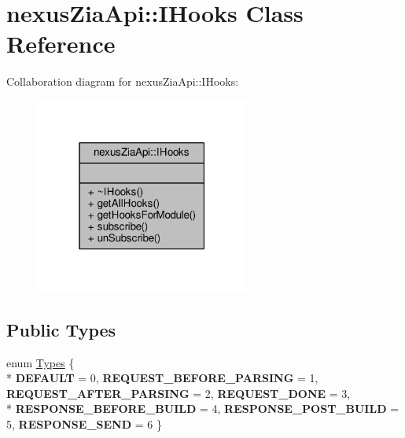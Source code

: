\hypertarget{classnexusZiaApi_1_1IHooks}{}\section{nexus\+Zia\+Api\+:\+:I\+Hooks Class Reference}
\label{classnexusZiaApi_1_1IHooks}


Collaboration diagram for nexus\+Zia\+Api\+:\+:I\+Hooks\+:\nopagebreak
\begin{figure}[H]
\begin{center}
\leavevmode
\includegraphics[width=199pt]{classnexusZiaApi_1_1IHooks__coll__graph}
\end{center}
\end{figure}
\subsection*{Public Types}
\begin{DoxyCompactItemize}
\item 
enum \hyperlink{classnexusZiaApi_1_1IHooks_ab414a80fd9ed1c967916942ec5c20433}{Types} \{ \\*
{\bfseries D\+E\+F\+A\+U\+LT} = 0, 
{\bfseries R\+E\+Q\+U\+E\+S\+T\+\_\+\+B\+E\+F\+O\+R\+E\+\_\+\+P\+A\+R\+S\+I\+NG} = 1, 
{\bfseries R\+E\+Q\+U\+E\+S\+T\+\_\+\+A\+F\+T\+E\+R\+\_\+\+P\+A\+R\+S\+I\+NG} = 2, 
{\bfseries R\+E\+Q\+U\+E\+S\+T\+\_\+\+D\+O\+NE} = 3, 
\\*
{\bfseries R\+E\+S\+P\+O\+N\+S\+E\+\_\+\+B\+E\+F\+O\+R\+E\+\_\+\+B\+U\+I\+LD} = 4, 
{\bfseries R\+E\+S\+P\+O\+N\+S\+E\+\_\+\+P\+O\+S\+T\+\_\+\+B\+U\+I\+LD} = 5, 
{\bfseries R\+E\+S\+P\+O\+N\+S\+E\+\_\+\+S\+E\+ND} = 6
 \}
\end{DoxyCompactItemize}

